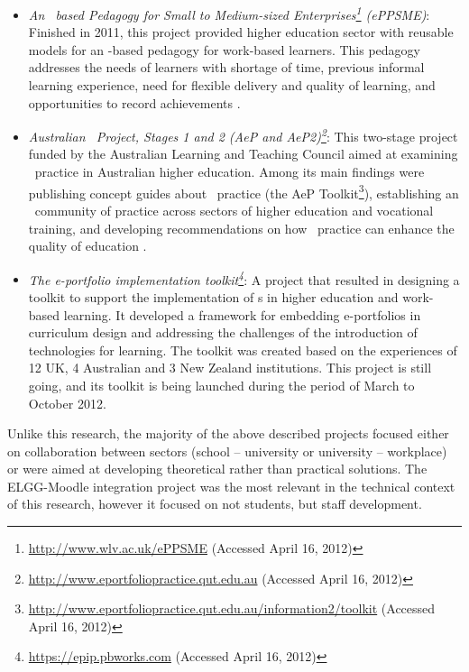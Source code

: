 \begin{itemize}
  \item \textit{An \ep~based Pedagogy for Small to Medium-sized
  Enterprises\footnote{\url{http://www.wlv.ac.uk/ePPSME} (Accessed April 16,
  2012)} (ePPSME)}: Finished in 2011, this project provided higher education sector with reusable models for an \ep-based pedagogy for work-based learners. This pedagogy addresses
  the needs of learners with shortage of time, previous informal learning
  experience, need for flexible delivery and quality of learning, and
  opportunities to record achievements \citep{Felce2011}.
  
  \item \textit{Australian \ep~Project, Stages 1 and 2 (AeP and
  AeP2)\footnote{\url{http://www.eportfoliopractice.qut.edu.au} (Accessed April
  16, 2012)}}: This two-stage project funded by the Australian Learning and
  Teaching Council aimed at examining \ep~practice in Australian higher
  education. Among its main findings were publishing concept guides about
  \ep~practice (the AeP
  Toolkit\footnote{\url{http://www.eportfoliopractice.qut.edu.au/information2/toolkit}
  (Accessed April 16, 2012)}), establishing an \ep~community of practice across
  sectors of higher education and vocational training, and developing
  recommendations on how \ep~practice can enhance the quality of education
  \citep{Hallam2008,Hallam2009}.
  
  \item \textit{The e-portfolio implementation
  toolkit\footnote{\url{https://epip.pbworks.com} (Accessed April 16, 2012)}}: A
  project that resulted in designing a toolkit to support the implementation of
  \ep s in higher education and work-based learning. It developed a framework
  for embedding e-portfolios in curriculum design and addressing the challenges
  of the introduction of technologies for learning. The toolkit was created
  based on the experiences of 12 UK, 4 Australian and 3 New Zealand
  institutions. This project is still going, and its toolkit is being launched
  during the period of March to October 2012.
\end{itemize}

Unlike this research, the majority of the above described projects focused
either on collaboration between sectors (school -- university or university --
workplace) or were aimed at developing theoretical rather than practical
solutions. The ELGG-Moodle integration project was the most relevant in
the technical context of this research, however it focused on not students,
but staff development. 


